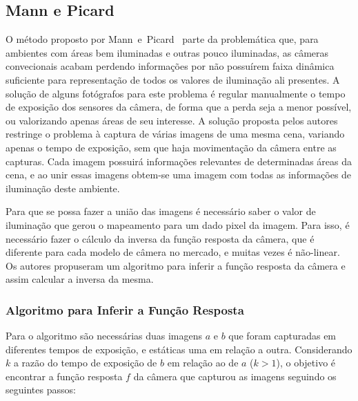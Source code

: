 \subsection{Mann e Picard} \label{metodoMann}
O método proposto por Mann~e~Picard~\cite{mann} parte da problemática que, para ambientes com áreas bem iluminadas e outras pouco iluminadas, as câmeras convecionais acabam perdendo informações por não possuírem faixa dinâmica suficiente para representação de todos os valores de iluminação ali presentes. A solução de alguns fotógrafos para este problema é regular manualmente o tempo de exposição dos sensores da câmera, de forma que a perda seja a menor possível, ou valorizando apenas áreas de seu interesse. A solução proposta pelos autores restringe o problema à captura de várias imagens de uma mesma cena, variando apenas o tempo de exposição, sem que haja movimentação da câmera entre as capturas. Cada imagem possuirá informações relevantes de determinadas áreas da cena, e ao unir essas imagens obtem-se uma imagem com todas as informações de iluminação deste ambiente.
 
 
Para que se possa fazer a união das imagens é necessário saber o valor de iluminação que gerou o mapeamento para um dado pixel da imagem. Para isso, é necessário fazer o cálculo da inversa da função resposta da câmera, que é diferente para cada modelo de câmera no mercado, e muitas vezes é não-linear. Os autores propuseram um algoritmo para inferir a função resposta da câmera e assim calcular a inversa da mesma.

\subsubsection{Algoritmo para Inferir a Função Resposta} \label{metodoMannAlg}

Para o algoritmo são necessárias duas imagens $a$ e $b$ que foram capturadas em diferentes tempos de exposição, e estáticas uma em relação a outra. Considerando $k$ a razão do tempo de exposição de $b$ em relação ao de $a$ ($k > 1$), o objetivo é encontrar a função resposta $f$ da câmera que capturou as imagens seguindo os seguintes passos:

